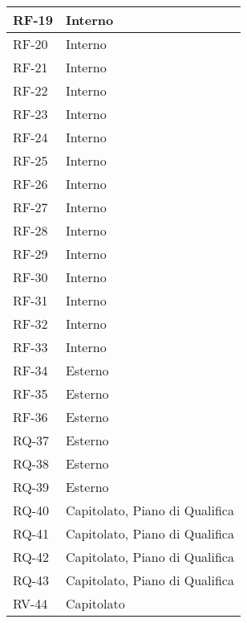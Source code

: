 \begin{longtable}{|>{\centering\arraybackslash}m{}|>{\centering\arraybackslash}m{}|}
	RF-19              & Interno                        \\\hline
	RF-20              & Interno                        \\\hline
	RF-21              & Interno                        \\\hline
	RF-22              & Interno                        \\\hline
	RF-23              & Interno                        \\\hline
	RF-24              & Interno                        \\\hline
	RF-25              & Interno                        \\\hline
	RF-26              & Interno                        \\\hline
	RF-27              & Interno                        \\\hline
	RF-28              & Interno                        \\\hline
	RF-29              & Interno                        \\\hline
	RF-30              & Interno                        \\\hline
	RF-31              & Interno                        \\\hline
	RF-32              & Interno                        \\\hline
	RF-33              & Interno                        \\\hline
	RF-34              & Esterno                        \\\hline
	RF-35              & Esterno                        \\\hline
	RF-36              & Esterno                        \\\hline
	RQ-37              & Esterno                        \\\hline
	RQ-38              & Esterno                        \\\hline
	RQ-39              & Esterno                        \\\hline
	RQ-40              & Capitolato, Piano di Qualifica \\\hline
	RQ-41              & Capitolato, Piano di Qualifica \\\hline
	RQ-42              & Capitolato, Piano di Qualifica \\\hline
	RQ-43              & Capitolato, Piano di Qualifica \\\hline
	RV-44              & Capitolato                     \\\hline

\end{longtable}
